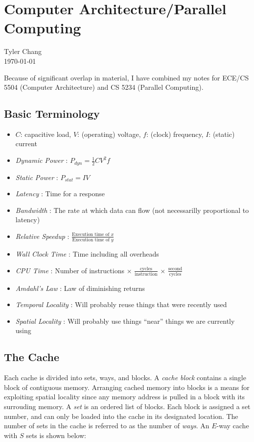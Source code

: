 \documentclass[12pt]{article}
\begin{document}
\section*{Computer Architecture/Parallel Computing}
Tyler Chang\\
\today

Because of significant overlap in material, I have combined my notes for 
ECE/CS 5504 (Computer Architecture) and CS 5234 (Parallel Computing).

\subsection*{Basic Terminology}

\begin{itemize}
\item $C$: capacitive load, $V$: (operating) voltage, $f$: (clock) frequency,
$I$: (static) current
\item {\it Dynamic Power} : $P_{dyn} = \frac{1}{2}CV^2f$
\item {\it Static Power} : $P_{stat} = IV$
\item {\it Latency} : Time for a response
\item {\it Bandwidth} : The rate at which data can flow (not necessarilly
proportional to latency)
\item {\it Relative Speedup} : 
$\frac{\text{Execution time of $x$}}{\text{Execution time of $y$}}$
\item {\it Wall Clock Time} : Time including all overheads
\item {\it CPU Time} : Number of instructions $\times$ 
$\frac{\text{cycles}}{\text{instruction}}$ 
$\times$ $\frac{\text{second}}{\text{cycles}}$
\item {\it Amdahl's Law} : Law of diminishing returns
\item {\it Temporal Locality} : Will probably reuse things that were
recently used
\item {\it Spatial Locality} : Will probably use things ``near''
things we are currently using
\end{itemize}

\subsection*{The Cache}

Each cache is divided into sets, ways, and blocks.
A {\it cache block} contains a single block of contiguous memory.
Arranging cached memory into blocks is a means for exploiting spatial
locality since any memory address is pulled in a block with its surrouding
memory.
A {\it set} is an ordered list of blocks.
Each block is assigned a set number, and can only be loaded into
the cache in its designated location.
The number of sets in the cache is referred to as the number of {\it ways}.
An $E$-way cache with $S$ sets is shown below:
\end{document}
